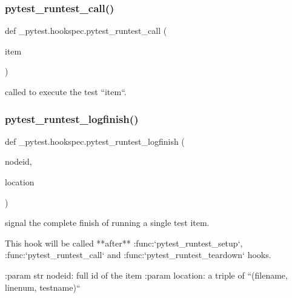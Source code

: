 \subsubsection{\texorpdfstring{pytest\+\_\+runtest\+\_\+call()}{pytest\_runtest\_call()}}
{\footnotesize\ttfamily def \+\_\+pytest.\+hookspec.\+pytest\+\_\+runtest\+\_\+call (\begin{DoxyParamCaption}\item[{}]{item }\end{DoxyParamCaption})}

\begin{DoxyVerb}called to execute the test ``item``. \end{DoxyVerb}
 \mbox{\label{namespace__pytest_1_1hookspec_af0925a9799718b69aa8135ccbf500b08}} 
\subsubsection{\texorpdfstring{pytest\+\_\+runtest\+\_\+logfinish()}{pytest\_runtest\_logfinish()}}
{\footnotesize\ttfamily def \+\_\+pytest.\+hookspec.\+pytest\+\_\+runtest\+\_\+logfinish (\begin{DoxyParamCaption}\item[{}]{nodeid,  }\item[{}]{location }\end{DoxyParamCaption})}

\begin{DoxyVerb}signal the complete finish of running a single test item.

This hook will be called **after** :func:`pytest_runtest_setup`, :func:`pytest_runtest_call` and
:func:`pytest_runtest_teardown` hooks.

:param str nodeid: full id of the item
:param location: a triple of ``(filename, linenum, testname)``
\end{DoxyVerb}
 \mbox{\label{namespace__pytest_1_1hookspec_a193ef20b875638293433e92c8debd190}} 
